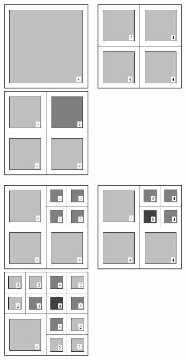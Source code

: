 \centerline{\includegraphics[width=1.8in]{amr2-1.eps} \ \
            \includegraphics[width=1.8in]{amr2-2.eps} \ \
            \includegraphics[width=1.8in]{amr2-3.eps}}

\centerline{\includegraphics[width=1.8in]{amr2-4.eps} \ \
            \includegraphics[width=1.8in]{amr2-5.eps} \ \
            \includegraphics[width=1.8in]{amr2-7.eps}}


